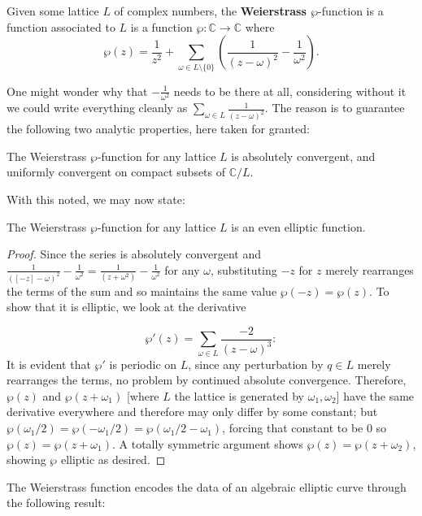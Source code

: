 \begin{definition}
    Given some lattice $L$ of complex numbers, the \textbf{Weierstrass $\wp$}-function is a function associated to $L$ is a function $\wp: \mathbb{C} \to \mathbb{C}$ where
    \[\wp(z) = \frac{1}{z^2} + \sum_{\omega \in L \setminus \{0 \}} \left( \frac{1}{(z - \omega)^2}  - \frac{1}{\omega^2} \right).\]
\end{definition}

One might wonder why that $-\frac{1}{\omega^2}$ needs to be there at all, considering without it we could write everything cleanly as $\sum_{\omega \in L} \frac{1}{(z - \omega)^2}$. The reason is to guarantee the following two analytic properties, here taken for granted:

\begin{lemma}
    The Weierstrass $\wp$-function for any lattice $L$ is absolutely convergent, and uniformly convergent on compact subsets of $\mathbb{C} / L$.
\end{lemma}

With this noted, we may now state:

\begin{proposition}
     The Weierstrass $\wp$-function for any lattice $L$ is an even elliptic function.
\end{proposition}

\begin{proof}
    Since the series is absolutely convergent and $\frac{1}{([-z] - \omega)^2} - \frac{1}{\omega^2} = \frac{1}{(z + \omega^2)} - \frac{1}{\omega^2}$ for any $\omega$, substituting $-z$ for $z$ merely rearranges the terms of the sum and so maintains the same value $\wp(-z) = \wp(z)$. To show that it is elliptic, we look at the derivative

\[\wp'(z) = \sum_{\omega \in L}{\frac{-2}{(z - \omega)^3}}:\]
    It is evident that $\wp'$ is periodic on $L$, since any perturbation by $q \in L$ merely rearranges the terms, no problem by continued absolute convergence. Therefore, $\wp(z)$ and $\wp(z + \omega_1)$ [where $L$ the lattice is generated by $\omega_1, \omega_2$] have the same derivative everywhere and therefore may only differ by some constant; but $\wp(\omega_1/2) = \wp(- \omega_1/2) = \wp(\omega_1/2 - \omega_1)$, forcing that constant to be $0$ so $\wp(z) = \wp(z + \omega _1)$. A totally symmetric argument shows $\wp (z)  =\wp(z + \omega_2)$, showing $\wp$ elliptic as desired.   
\end{proof}

The Weierstrass function encodes the data of an algebraic elliptic curve through the following result:

